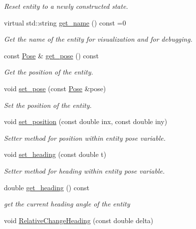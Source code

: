 \begin{DoxyCompactItemize}
\begin{DoxyCompactList}\small\item\em Reset entity to a newly constructed state. \end{DoxyCompactList}\item 
virtual std\+::string \hyperlink{classArenaEntity_ad43152003033cf01ad86eeff1990b69a}{get\+\_\+name} () const =0
\begin{DoxyCompactList}\small\item\em Get the name of the entity for visualization and for debugging. \end{DoxyCompactList}\item 
const \hyperlink{structPose}{Pose} \& \hyperlink{classArenaEntity_af3cf4d62c4392bf9b34238693a0f4d9c}{get\+\_\+pose} () const 
\begin{DoxyCompactList}\small\item\em Get the position of the entity. \end{DoxyCompactList}\item 
void \hyperlink{classArenaEntity_a6eb76e5f1b5949314c12cc512d6930ae}{set\+\_\+pose} (const \hyperlink{structPose}{Pose} \&pose)
\begin{DoxyCompactList}\small\item\em Set the position of the entity. \end{DoxyCompactList}\item 
void \hyperlink{classArenaEntity_a3136704edf07c24639319abf5c28dac0}{set\+\_\+position} (const double inx, const double iny)
\begin{DoxyCompactList}\small\item\em Setter method for position within entity pose variable. \end{DoxyCompactList}\item 
void \hyperlink{classArenaEntity_ac1cc3c6997bc7a9573128fc5ded9eb72}{set\+\_\+heading} (const double t)
\begin{DoxyCompactList}\small\item\em Setter method for heading within entity pose variable. \end{DoxyCompactList}\item 
double \hyperlink{classArenaEntity_a639b81acd35dc69ca97f5d197d04babf}{get\+\_\+heading} () const 
\begin{DoxyCompactList}\small\item\em get the current heading angle of the entity \end{DoxyCompactList}\item 
void \hyperlink{classArenaEntity_a4c4bd7f5ffb778979303c33cb3bc9986}{Relative\+Change\+Heading} (const double delta)

\end{DoxyCompactItemize}
